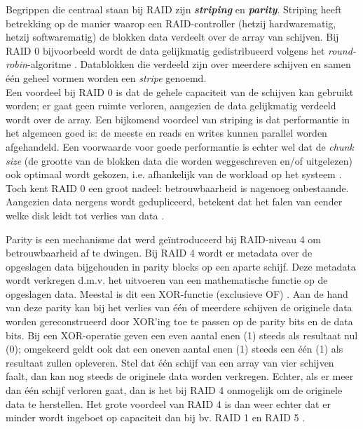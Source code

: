 Begrippen die centraal staan bij RAID zijn \textit{\textbf{striping}} en \textit{\textbf{parity}}. Striping heeft betrekking op de manier waarop een RAID-controller (hetzij hardwarematig, hetzij softwarematig) de blokken data verdeelt over de array van schijven. Bij RAID 0 bijvoorbeeld wordt de data gelijkmatig gedistribueerd volgens het \textit{round-robin}-algoritme \autocite{OSThreePiecesRemzi2015}. Datablokken die verdeeld zijn over meerdere schijven en samen één geheel vormen worden een \textit{stripe} genoemd. \\ 
Een voordeel bij RAID 0 is dat de gehele capaciteit van de schijven kan gebruikt worden; er gaat geen ruimte verloren, aangezien de data gelijkmatig verdeeld wordt over de array. Een bijkomend voordeel van striping is dat performantie in het algemeen goed is: de meeste en reads en writes kunnen parallel worden afgehandeld. Een voorwaarde voor goede performantie is echter wel dat de \textit{chunk size} (de grootte van de blokken data die worden weggeschreven en/of uitgelezen) ook optimaal wordt gekozen, i.e. afhankelijk van de workload op het systeem \autocite{OSThreePiecesRemzi2015}. Toch kent RAID 0 een groot nadeel: betrouwbaarheid is nagenoeg onbestaande. Aangezien data nergens wordt gedupliceerd, betekent dat het falen van eender welke disk leidt tot verlies van data \autocite{OSThreePiecesRemzi2015}.

Parity is een mechanisme dat werd geïntroduceerd bij RAID-niveau 4 om betrouwbaarheid af te dwingen. Bij RAID 4 wordt er metadata over de opgeslagen data bijgehouden in parity blocks op een aparte schijf. Deze metadata wordt verkregen d.m.v. het uitvoeren van een mathematische functie op de opgeslagen data. Meestal is dit een XOR-functie (exclusieve OF) \autocite{Chen1994}. Aan de hand van deze parity kan bij het verlies van één of meerdere schijven de originele data worden gereconstrueerd door XOR'ing toe te passen op de parity bits en de data bits. Bij een XOR-operatie geven een even aantal enen (1) steeds als resultaat nul (0); omgekeerd geldt ook dat een oneven aantal enen (1) steeds een één (1) als resultaat zullen opleveren. Stel dat één schijf van een array van vier schijven faalt, dan kan nog steeds de originele data worden verkregen. Echter, als er meer dan één schijf verloren gaat, dan is het bij RAID 4 onmogelijk om de originele data te herstellen. Het grote voordeel van RAID 4 is dan weer echter dat er minder wordt ingeboet op capaciteit  dan bij bv. RAID 1 en RAID 5 \autocite{OSThreePiecesRemzi2015}. 

